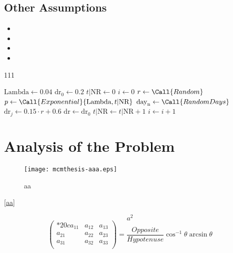 \documentclass{mcmthesis}
\begin{document}
\subsection{Other Assumptions}
\lipsum[6]
\begin{itemize}
\item
\item
\item
\item
\end{itemize}

\lipsum[7]

\begin{algorithm}
  \caption{111}
  \begin{algorithmic}[1]
  \State $\text{Lambda} \gets 0.04$
  \State $\text{dr}_0 \gets 0.2$
  \State $t|\text{NR} \gets 0$
  \State $i \gets 0$
      \State $r \gets \Call{Random}$
      \State $p \gets \Call{Exponential}{\text{Lambda}, t|\text{NR}}$
          \State $\text{day}_\text{n} \gets \Call{RandomDays}$
              \State $\text{dr}_j \gets 0.15 \cdot r + 0.6$
          \EndFor
      \Else
          \State $\text{dr} \gets \text{dr}_0$
          \State $t|\text{NR} \gets t|\text{NR} + 1$
      \EndIf
      \State $i \gets i + 1$
  \EndWhile
  \end{algorithmic}
  \end{algorithm}

\section{Analysis of the Problem}
% 
\begin{figure}[h]
\small
\centering
\texttt{[image: mcmthesis-aaa.eps]}
\caption{aa} \label{fig:aa}
\end{figure}

\lipsum[8] \eqref{aa}

\begin{equation}
a^2 \label{aa}
\end{equation}
\[
  \begin{pmatrix}{*{20}c}
  {a_{11} } & {a_{12} } & {a_{13} }  \\
  {a_{21} } & {a_{22} } & {a_{23} }  \\
  {a_{31} } & {a_{32} } & {a_{33} }  \\
  \end{pmatrix}
  = \frac{{Opposite}}{{Hypotenuse}}\cos ^{ - 1} \theta \arcsin \theta
\]
\lipsum[9]
\end{document}
